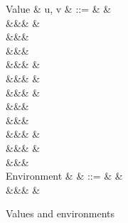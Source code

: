 \begin{figure}
\begin{syntaxfig}
\mbox{Value}
&
u, v
&
::=
&
\bot
&
\\
&&&
\exTrue \mid \exFalse
&
\\
&&&
\exTrueSel \mid \exFalseSel
\\
&&&
\\
&&&
&
\\
&&&
&
\\
&&&
&
\\
&&&
\\
&&&
\exNil
\\
&&&
\exNilSel
&
\\
&&&
&
\\
&&&
\\[2mm]
\mbox{Environment}
&
\rho
&
::=
&
\envEmpty
&
\\
&&&
&
\end{syntaxfig}
\caption{Values and environments}
\end{figure}
